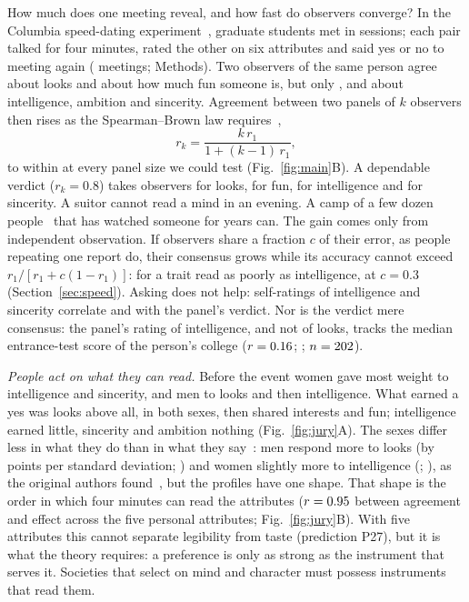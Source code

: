 How much does one meeting reveal, and how fast do observers converge? In the Columbia speed-dating
experiment~\cite{fisman2006}, \SdN{} graduate students met in \SdSessions{} sessions; each pair talked for four minutes,
rated the other on six attributes and said yes or no to meeting again (\SdRows{} meetings; Methods). Two observers of the
same person agree \JurOneAtt{} about looks and \JurOneFun{} about how much fun someone is, but only \JurOneInt,
\JurOneAmb{} and \JurOneSin{} about intelligence, ambition and sincerity. Agreement between two panels of $k$ observers
then rises as the Spearman--Brown law requires~\cite{spearman1910,brown1910},
\begin{equation}
r_k=\frac{k\,r_1}{1+(k-1)\,r_1},\label{eq:sb}
\end{equation}
to within \JurGapMax{} at every panel size we could test (Fig.~\ref{fig:main}B). A dependable verdict ($r_k=0.8$) takes
\JurKAtt{} observers for looks, \JurKFun{} for fun, \JurKInt{} for intelligence and \JurKSin{} for sincerity. A suitor
cannot read a mind in an evening. A camp of a few dozen people~\cite{hill2011} that has watched someone for years can.
The gain comes only from independent observation. If observers share a fraction $c$ of their error, as people repeating
one report do, their consensus grows while its accuracy cannot exceed $r_1/[r_1+c(1-r_1)]$: \JurCeil{} for a trait read as
poorly as intelligence, at $c=0.3$ (Section~\ref{sec:speed}).
Asking does not help: self-ratings of intelligence and sincerity correlate \SdSelfInt{} and \SdSelfSin{} with the panel's
verdict. Nor is the verdict mere consensus: the panel's rating of intelligence, and not of looks, tracks the median
entrance-test score of the person's college ($r=0.16$; \SdSatCI; $n=202$).

\emph{People act on what they can read.} Before the event women gave most weight to intelligence and sincerity, and men to
looks and then intelligence. What earned a yes was looks above all, in both sexes, then shared interests and fun;
intelligence earned little, sincerity and ambition nothing (Fig.~\ref{fig:jury}A). The sexes differ less in what they do
than in what they say~\cite{eastwick2014,eastwick2025}: men respond more to looks (by \SdRevDiffAtt{} points per standard
deviation; \SdRevDiffAttCI) and women slightly more to intelligence (\SdRevDiffInt; \SdRevDiffIntCI), as the original
authors found~\cite{fisman2006}, but the profiles have one shape. That shape is the order in which four minutes can read
the attributes ($r=0.95$ between agreement and effect across the five personal attributes; Fig.~\ref{fig:jury}B).
With five attributes this cannot separate legibility from taste (prediction P27), but it is what the theory requires: a
preference is only as strong as the instrument that serves it. Societies that select on mind and character must possess
instruments that read them.

